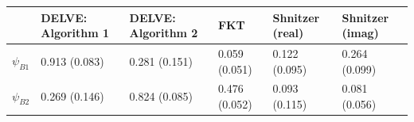 \begin{tabular}{llllll}
\toprule
 & DELVE: Algorithm 1 & DELVE: Algorithm 2 & FKT & Shnitzer (real) & Shnitzer (imag) \\
\midrule
$\psi_{B1}$ & 0.913 (0.083) & 0.281 (0.151) & 0.059 (0.051) & 0.122 (0.095) & 0.264 (0.099) \\
$\psi_{B2}$ & 0.269 (0.146) & 0.824 (0.085) & 0.476 (0.052) & 0.093 (0.115) & 0.081 (0.056) \\
\bottomrule
\end{tabular}
